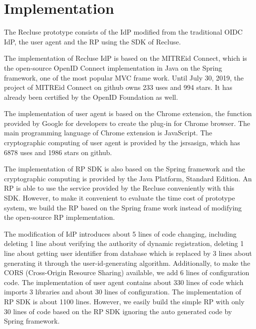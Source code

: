 \section{Implementation}
The Recluse prototype consists of the IdP modified from the traditional OIDC IdP, the user agent and the RP using the SDK of Recluse. 

The implementation of Recluse IdP is based on the MITREid Connect, which is the open-source OpenID Connect implementation in Java on the Spring framework, one of the most popular MVC frame work. Until July 30, 2019, the project of MITREid Connect on github owns 233 uses and 994 stars. It has already been certified by the OpenID Foundation as well. 

The implementation of user agent is based on the Chrome extension, the function provided by Google for developers to create the plug-in for Chrome browser. The main programming language of Chrome extension is JavaScript. The cryptographic computing of user agent is provided by the jsrsasign, which has 6878 uses and 1986 stars on github. 

The implementation of RP SDK is also based on the Spring framework and the cryptographic computing is provided by the Java Platform, Standard Edition. An RP is able to use the service provided by the Recluse conveniently with this SDK. However, to make it convenient to evaluate the time cost of prototype system, we build the RP based on the Spring frame work instead of modifying the open-source RP implementation.

The modification of IdP introduces about 5 lines of code changing, including deleting 1 line about verifying the authority of dynamic registration, deleting 1 line about getting user identifier from database which is replaced by 3 lines about generating it through the user-id-generating algorithm. Additionally, to make the CORS (Cross-Origin Resource Sharing) available, we add 6 lines of configuration code. The implementation of user agent contains about 330 lines of code which imports 3 libraries and about 30 lines of configuration. The implementation of RP SDK is about 1100 lines. However, we easily build the simple RP with only 30 lines of code based on the RP SDK ignoring the auto generated code by Spring framework.

